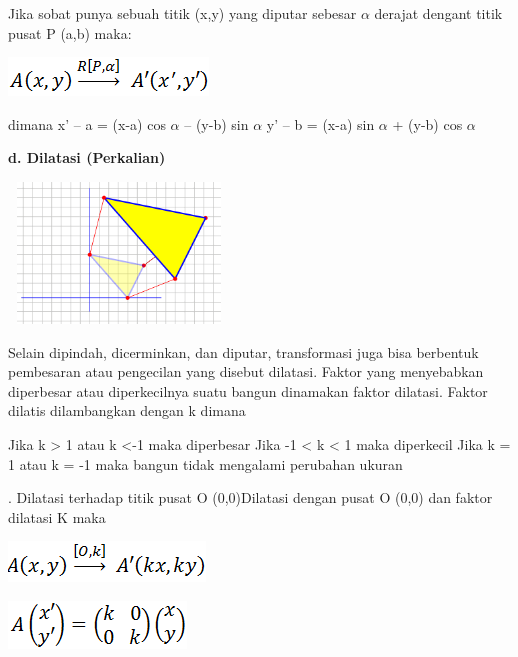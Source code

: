 \documentclass[11pt,fleqn]{book} %
\begin{document}
\noindent
Jika sobat punya sebuah titik (x,y) yang diputar sebesar $\alpha$ derajat dengant titik pusat P (a,b) maka:
\noindent
\begin{center}
\includegraphics{Pictures/8.PNG}\\
\end{center}


\noindent
dimana
\noindent x’ – a = (x-a) cos $\alpha$ – (y-b) sin $\alpha$
\noindent y’ – b = (x-a) sin $\alpha$  + (y-b) cos $\alpha$

\noindent \textbf{d. Dilatasi (Perkalian)}

\noindent
\begin{center}
	\noindent \includegraphics*[width=2.32in, height=1.48in, keepaspectratio=false, trim=0.00in 0.11in 0.00in 0.00in]{Pictures/9.PNG}
\end{center}

\noindent
Selain dipindah, dicerminkan, dan diputar, transformasi juga bisa berbentuk pembesaran atau pengecilan yang disebut dilatasi. Faktor yang menyebabkan diperbesar atau diperkecilnya suatu bangun dinamakan faktor dilatasi. Faktor dilatis dilambangkan dengan k dimana


\noindent Jika k > 1 atau k <-1 maka diperbesar
\noindent Jika -1 < k < 1 maka diperkecil
\noindent Jika k = 1 atau k = -1 maka bangun tidak mengalami perubahan ukuran

. Dilatasi terhadap titik pusat O (0,0)Dilatasi dengan pusat O (0,0) dan faktor dilatasi K maka
\noindent
\begin{center}
\includegraphics{Pictures/10.PNG}\\
\end{center}

\noindent
\begin{center}
\includegraphics{Pictures/11.PNG}\\
\end{center}
\end{document}
